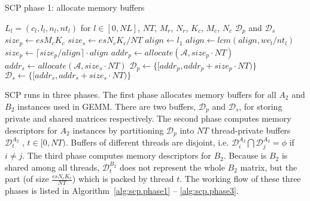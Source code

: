 \begin{algorithm}
  \caption{SCP phase 1: allocate memory buffers}
  \label{alg:scp.phase1}
  \begin{algorithmic}[1]
    \REQUIRE $L_l = (c_l,l_l,n_l,nt_l)$ for $l \in [0, NL]$, $NT$,
    $M_r$, $N_r$, $K_c$, $M_c$, $N_c$
    \ENSURE $\mathcal{D}_p$ and $\mathcal{D}_s$
    \STATE $size_p \gets es M_c K_c$ \label{line:size.p}
    \STATE $size_s \gets es N_c K_c / NT$ \label{line:size.s}
    \STATE $align \gets l_1$ \label{line:align.init}
     \label{line:align.for}
     \label{line:align.type}
    \STATE $align \gets lcm(align, wc_l / nt_l)$ \label{line:align.update}
    \ENDIF
    \ENDFOR \label{line:align.endfor}
    \STATE $size_p \gets \lceil size_p / align \rceil \cdot align$ \label{line:align}
    \STATE $addr_p \gets allocate(\mathcal{A}, size_p \cdot NT)$ \label{line:alloc.begin}
    \STATE $addr_s \gets allocate(\mathcal{A}, size_s \cdot NT)$ \label{line:alloc.end}
    \STATE $\mathcal{D}_p \gets \lbrace [addr_p, addr_p + size_p \cdot NT) \rbrace$ \label{line:d.begin}
    \STATE $\mathcal{D}_s \gets \lbrace [addr_s, addr_s + size_s \cdot NT) \rbrace$ \label{line:d.end}
  \end{algorithmic}
\end{algorithm}

SCP runs in three phases.
The first phase allocates memory buffers for all $A_2$ and $B_2$
instances used in GEMM. There are two buffers, $\mathcal{D}_p$ and $\mathcal{D}_s$,
for storing private and shared matrices respectively.
The second phase computes memory descriptors for $A_2$ instances
by partitioning $\mathcal{D}_p$ into $NT$ thread-private buffers
$\mathcal{D}_t^{A_2}$ , $t \in [0, NT)$.
Buffers of different threads are disjoint,
i.e. $\mathcal{D}_i^{A_2} \bigcap \mathcal{D}_j^{A_2} = \phi$ if $i \ne j$.
The third phase computes memory descriptors for $B_2$.
Because is $B_2$ is shared among all threads,
$\mathcal{D}_t^{B_2}$ does not represent the whole $B_2$ matrix,
but the part (of size $\frac{es N_c K_c}{NT}$) which is packed by thread $t$.
The working flow of these three phases is listed
in Algorithm~\ref{alg:scp.phase1} -- \ref{alg:scp.phase3}.

